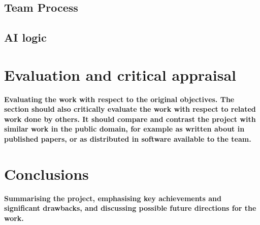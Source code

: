 \documentclass[a4paper,doc,draftfirst]{apa6}
\begin{document}
\subsection{Team Process}


\subsection{AI logic}

\lipsum[80-85]

\section{Evaluation and critical appraisal}
\textbf{Evaluating the work with respect to the original objectives. The section should also critically evaluate the work with respect to related work done by others. It should compare and contrast the project with similar work in the public domain, for example as written about in published papers, or as distributed in software available to the team.}

\lipsum[31-45]




\section{Conclusions}
\textbf{Summarising the project, emphasising key achievements and significant drawbacks, and discussing possible future directions for the work.}

\lipsum[46-55]
\end{document}

